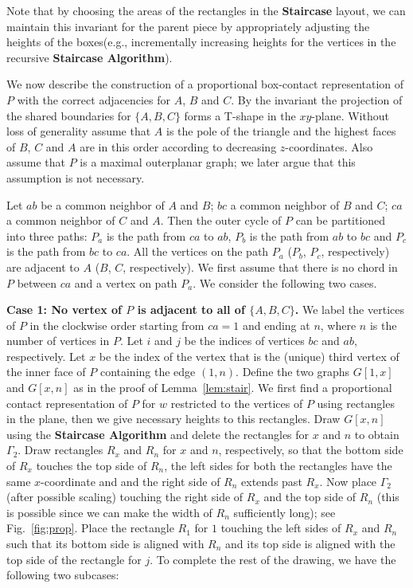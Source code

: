 \documentclass{llncs}
\begin{document}
	
	Note that by choosing the areas of the rectangles in the \textbf{Staircase} layout,
	we can maintain this invariant for the parent piece by appropriately adjusting the heights of the boxes(e.g., incrementally increasing heights for the vertices in the
	recursive \textbf{Staircase Algorithm}).
	
	
	We now describe the construction of a proportional box-contact representation of $P$
	with the correct adjacencies for $A$, $B$ and $C$.
	By the invariant the projection of the shared boundaries for $\{A,B,C\}$ forms a T-shape
	in the $xy$-plane. 
Without loss of generality assume that $A$ is the pole of the triangle and the highest faces
	of $B$, $C$ and $A$ are in this order according to decreasing $z$-coordinates.
Also assume that $P$ is a maximal outerplanar graph; we later argue
	that this assumption is not necessary.
	
Let $ab$ be a common neighbor of $A$ and $B$; $bc$ a common neighbor of $B$ and $C$;
	$ca$ a common neighbor of $C$ and $A$. Then the outer cycle of $P$ can be partitioned
	into three paths: $P_a$ is the path from $ca$ to $ab$, $P_b$ is the path from $ab$ to
	$bc$ and $P_c$ is the path from $bc$ to $ca$. All the vertices on the path
	$P_a$ ($P_b$, $P_c$, respectively) are adjacent to $A$ ($B$, $C$, respectively). We
	first assume that there is no chord in $P$ between $ca$ and a vertex on path $P_a$.
	We consider the following two cases.
	
	


	
	\smallskip\noindent
	\textbf{Case 1: No vertex of $P$ is adjacent to all of $\{A,B,C\}$.} We label the vertices
	of $P$ in the clockwise order starting from $ca=1$ and ending at $n$, where $n$ is the
	number of vertices in $P$. Let $i$ and $j$ be the indices of vertices $bc$ and $ab$,
	respectively. Let $x$ be the index of the vertex that is the (unique) third vertex of
	the inner face of $P$ containing the edge $(1,n)$. Define the two graphs $G[1,x]$ and
	$G[x,n]$ as in the proof of Lemma~\ref{lem:stair}. We first find a proportional contact
	representation of $P$ for $w$ restricted to the vertices of $P$
	using rectangles in the plane, then we give necessary heights to this rectangles.
	Draw $G[x,n]$ using the \textbf{Staircase Algorithm} and delete the rectangles for $x$ and
	$n$ to obtain $\Gamma_2$. Draw rectangles $R_x$ and $R_n$ for $x$ and $n$,
	respectively, so that the bottom side of $R_x$ touches the top side of $R_n$, the left
	sides for both the rectangles have the same $x$-coordinate and and the right side of
	$R_n$ extends past $R_x$. Now place $\Gamma_2$ (after possible scaling) touching the
	right side of $R_x$ and the top side of $R_n$ (this is possible since we can make the
	width of $R_n$ sufficiently long); see Fig.~\ref{fig:prop}. Place the rectangle $R_1$
	for $1$ touching the left sides of $R_x$ and $R_n$ such that its bottom side is aligned
	with $R_n$ and its top side is aligned with the top side of the rectangle for $j$.
	To complete the rest of the drawing, we have the following two subcases:
	
\end{document}
